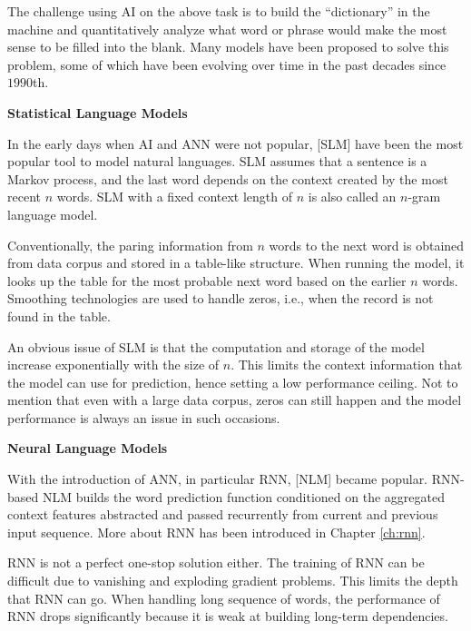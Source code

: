 The challenge using AI on the above task is to build the ``dictionary'' in the machine and quantitatively analyze what word or phrase would make the most sense to be filled into the blank. Many models have been proposed to solve this problem, some of which have been evolving over time in the past decades since $1990$th.

\vspace{0.1in}
\noindent \textbf{Statistical Language Models}
\vspace{0.1in}

In the early days when AI and ANN were not popular, [SLM] have been the most popular tool to model natural languages. SLM assumes that a sentence is a Markov process, and the last word depends on the context created by the most recent $n$ words. SLM with a fixed context length of $n$ is also called an $n$-gram language model.

Conventionally, the paring information from $n$ words to the next word is obtained from data corpus and stored in a table-like structure. When running the model, it looks up the table for the most probable next word based on the earlier $n$ words. Smoothing technologies are used to handle zeros, i.e., when the record is not found in the table.

An obvious issue of SLM is that the computation and storage of the model increase exponentially with the size of $n$. This limits the context information that the model can use for prediction, hence setting a low performance ceiling. Not to mention that even with a large data corpus, zeros can still happen and the model performance is always an issue in such occasions.

\vspace{0.1in}
\noindent \textbf{Neural Language Models}
\vspace{0.1in}

With the introduction of ANN, in particular RNN, [NLM] became popular. RNN-based NLM builds the word prediction function conditioned on the aggregated context features abstracted and passed recurrently from current and previous input sequence. More about RNN has been introduced in Chapter \ref{ch:rnn}.

RNN is not a perfect one-stop solution either. The training of RNN can be difficult due to vanishing and exploding gradient problems. This limits the depth that RNN can go. When handling long sequence of words, the performance of RNN drops significantly because it is weak at building long-term dependencies.

